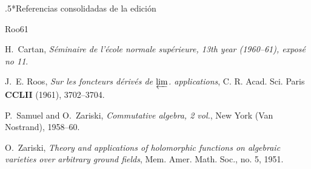 \documentclass[oneside]{amsart}
\makeatletter
\renewcommand*{\section}{%
  \@startsection{section}{1}{\z@}{.7\linespacing\@plus\linespacing}%
  {.5\linespacing}{\normalfont\bfseries\Large\scshape\centering}}
\makeatother
\begin{document}
\clearpage
{}
{}
\section*{Referencias consolidadas de la edición}
\providecommand{\bysame}{\leavevmode\hbox to3em{\hrulefill}\thinspace}
\providecommand{\MR}{\relax\ifhmode\unskip\space\fi MR }
\providecommand{\MRhref}[2]{%
  \href{http://www.ams.org/mathscinet-getitem?mr=#1}{#2}
}
\providecommand{\href}[2]{#2}
\begin{thebibliography}{Roo61}

H.~Cartan, \emph{S\'eminaire de l'\'ecole normale sup\'erieure, 13th year
  (1960--61), expos\'e no 11}.

J.~E. Roos, \emph{Sur les foncteurs d\'eriv\'es de $\varprojlim$.
  applications}, C. R. Acad. Sci. Paris \textbf{CCLII} (1961), 3702--3704.

P.~Samuel and O.~Zariski, \emph{Commutative algebra, 2 vol.}, New York (Van
  Nostrand), 1958--60.

O.~Zariski, \emph{Theory and applications of holomorphic functions on algebraic
  varieties over arbitrary ground fields}, Mem. Amer. Math. Soc., no. 5, 1951.

\end{thebibliography}

\end{document}
